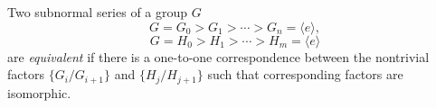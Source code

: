 Two subnormal series of a group $G$
$$G = G_0 > G_1 > \cdots > G_n = \langle e \rangle,$$
$$G = H_0 > H_1 > \cdots > H_m = \langle e \rangle$$
are \emph{equivalent} if there is a one-to-one correspondence between the nontrivial factors $\{G_i/G_{i+1}\}$ and $\{H_j/H_{j+1}\}$ such that corresponding factors are isomorphic.
